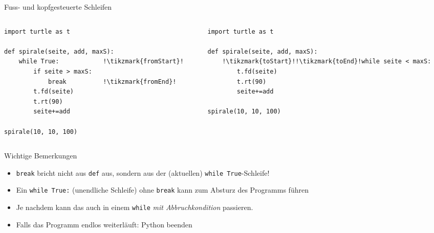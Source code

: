 \begin{frame}[fragile]{Fuss- und kopfgesteuerte Schleifen}
    \begin{columns}
        \begin{column}{.47\textwidth}
            \begin{lstlisting}[escapechar=!,basicstyle=\footnotesize\ttfamily]
import turtle as t

def spirale(seite, add, maxS):
    while True:            !\tikzmark{fromStart}!
    	if seite > maxS:
    	    break          !\tikzmark{fromEnd}!
        t.fd(seite)
        t.rt(90)
        seite+=add

spirale(10, 10, 100)
\end{lstlisting}
        \end{column}
        \begin{column}{.5\textwidth}
            \begin{lstlisting}[escapechar=!,basicstyle=\footnotesize\ttfamily]
import turtle as t

def spirale(seite, add, maxS):
    !\tikzmark{toStart}!!\tikzmark{toEnd}!while seite < maxS:
        t.fd(seite)
        t.rt(90)
        seite+=add
        
spirale(10, 10, 100)
\end{lstlisting}
        \end{column}
    \end{columns}

\end{frame}

\begin{frame}[fragile]{Wichtige Bemerkungen}
    \begin{itemize}[<+->]
        \item \lstinline|break| bricht nicht aus \lstinline|def| aus, sondern aus der (aktuellen) \lstinline|while True|-Schleife!
        \item Ein \lstinline|while True:| (unendliche Schleife) ohne \lstinline|break| kann zum Absturz des Programms führen 
        \item Je nachdem kann das auch in einem \lstinline|while| \textit{mit Abbruchkondition} passieren.
        \item Falls das Programm endlos weiterläuft: Python beenden \faTrash
    \end{itemize}
\end{frame}

